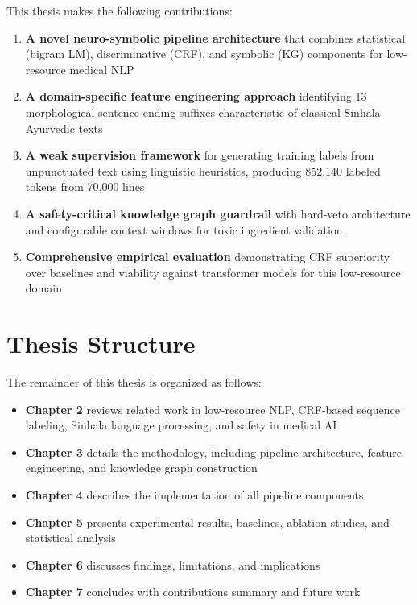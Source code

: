 \documentclass[12pt, a4paper, twoside]{report}
\begin{document}
This thesis makes the following contributions:

\begin{enumerate}
    \item \textbf{A novel neuro-symbolic pipeline architecture} that combines statistical (bigram LM), discriminative (CRF), and symbolic (KG) components for low-resource medical NLP
    
    \item \textbf{A domain-specific feature engineering approach} identifying 13 morphological sentence-ending suffixes characteristic of classical Sinhala Ayurvedic texts
    
    \item \textbf{A weak supervision framework} for generating training labels from unpunctuated text using linguistic heuristics, producing 852,140 labeled tokens from 70,000 lines
    
    \item \textbf{A safety-critical knowledge graph guardrail} with hard-veto architecture and configurable context windows for toxic ingredient validation
    
    \item \textbf{Comprehensive empirical evaluation} demonstrating CRF superiority over baselines and viability against transformer models for this low-resource domain
\end{enumerate}

\section{Thesis Structure}
\label{sec:structure}

The remainder of this thesis is organized as follows:

\begin{itemize}
    \item \textbf{Chapter 2} reviews related work in low-resource NLP, CRF-based sequence labeling, Sinhala language processing, and safety in medical AI
    \item \textbf{Chapter 3} details the methodology, including pipeline architecture, feature engineering, and knowledge graph construction
    \item \textbf{Chapter 4} describes the implementation of all pipeline components
    \item \textbf{Chapter 5} presents experimental results, baselines, ablation studies, and statistical analysis
    \item \textbf{Chapter 6} discusses findings, limitations, and implications
    \item \textbf{Chapter 7} concludes with contributions summary and future work
\end{itemize}
\end{document}
